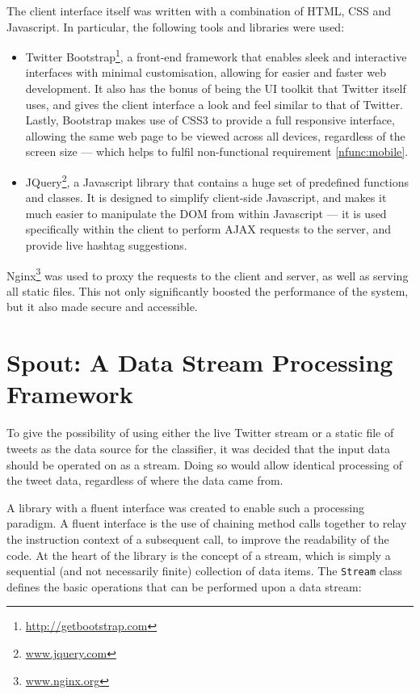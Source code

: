 \documentclass[11pt,a4paper]{report}
\begin{document}
The client interface itself was written with a combination of HTML, CSS and Javascript. In particular, the following tools and libraries were used:

\begin{itemize}
    \item Twitter Bootstrap\footnote{\url{http://getbootstrap.com}}, a front-end framework that enables sleek and interactive interfaces with minimal customisation, allowing for easier and faster web development. It also has the bonus of being the UI toolkit that Twitter itself uses, and gives the client interface a look and feel similar to that of Twitter. Lastly, Bootstrap makes use of CSS3 to provide a full responsive interface, allowing the same web page to be viewed across all devices, regardless of the screen size --- which helps to fulfil non-functional requirement \ref{nfunc:mobile}.
    \item JQuery\footnote{\url{www.jquery.com}}, a Javascript library that contains a huge set of predefined functions and classes. It is designed to simplify client-side Javascript, and makes it much easier to manipulate the DOM from within Javascript --- it is used specifically within the client to perform AJAX requests to the server, and provide live hashtag suggestions.
\end{itemize}

Nginx\footnote{\url{www.nginx.org}} was used to proxy the requests to the client and server, as well as serving all static files. This not only significantly boosted the performance of the system, but it also made secure and accessible.

\section{Spout: A Data Stream Processing Framework}
To give the possibility of using either the live Twitter stream or a static file of tweets as the data source for the classifier, it was decided that the input data should be operated on as a stream. Doing so would allow identical processing of the tweet data, regardless of where the data came from.

A library with a fluent interface was created to enable such a processing paradigm. A fluent interface is the use of chaining method calls together to relay the instruction context of a subsequent call, to improve the readability of the code. At the heart of the library is the concept of a stream, which is simply a sequential (and not necessarily finite) collection of data items. The \verb+Stream+ class defines the basic operations that can be performed upon a data stream:
\end{document}
